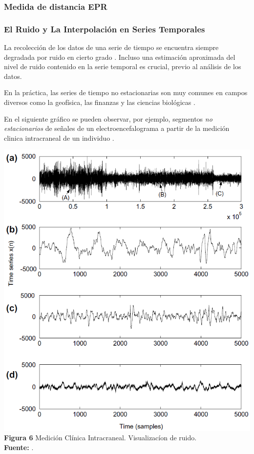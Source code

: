 \subsubsection{\textbf{Medida de distancia EPR}}
\subsubsection{El Ruido y La Interpolaci\'on en Series Temporales}
La recolecci\'on de los datos de una serie de tiempo se encuentra siempre degradada por ruido en cierto grado \cite{noise}. Incluso una estimaci\'on aproximada del nivel de ruido contenido en la serie temporal es crucial, previo al an\'alisis de los datos.\par
En la pr\'actica, las series de tiempo no estacionarias son muy comunes en campos diversos como la geof\'isica, las finanzas y las ciencias biol\'ogicas \cite{concepts}.\par
En el siguiente gr\'afico se pueden observar, por ejemplo, segmentos \textit{no estacionarios} de se\~nales de un electroencefalograma a partir de la medici\'on clinica intracraneal de un individuo \cite{noise}.
\begin{center}
\includegraphics[scale=0.7]{brainsignal.png}\\
\vspace*{10pt}
\footnotesize{\textbf{Figura 6} Medici\'on Cl\'inica Intracraneal. Visualizac\'ion de ruido.}\\ \textbf{Fuente:} \cite{noise}.
\end{center}
